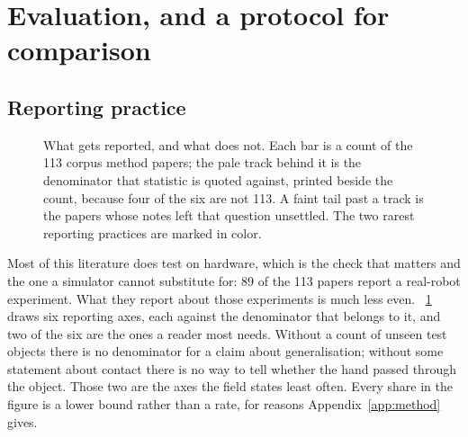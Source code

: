 \section{Evaluation, and a protocol for comparison}
\label{sec:evaluation}

\makeatletter
{}
\makeatother

\subsection{Reporting practice}
\label{subsec:reporting}

\begin{figure}[!t]
\centering
{}
\caption{What gets reported, and what does not. Each bar is a count of the 113 corpus method
papers; the pale track behind it is the denominator that statistic is quoted against, printed beside
the count, because four of the six are not 113. A faint tail past a track is the papers whose notes
left that question unsettled. The two rarest reporting practices are marked in color.}
\label{fig:reporting}
\end{figure}

Most of this literature does test on hardware, which is the check that matters and the one a
simulator cannot substitute for: 89 of the 113 papers report a real-robot experiment. What they
report about those experiments is much less even. \figurename~\ref{fig:reporting} draws six
reporting axes, each against the denominator that belongs to it, and two of the six are the ones a
reader most needs. Without a count of unseen test objects there is no denominator for a claim
about generalisation; without some statement about contact there is no way to tell whether the
hand passed through the object. Those two are the axes the field states least often. Every share
in the figure is a lower bound rather than a rate, for reasons Appendix~\ref{app:method} gives.

